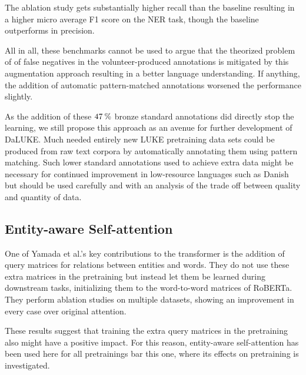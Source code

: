\documentclass[main.tex]{subfiles}
\begin{document}

The ablation study gets substantially higher recall than the baseline resulting in a higher micro average F1 score on the NER task, though the baseline outperforms in precision.

All in all, these benchmarks cannot be used to argue that the theorized problem of of false negatives in the volunteer-produced annotations is mitigated by this augmentation approach resulting in a better language understanding.
If anything, the addition of automatic pattern-matched annotations worsened the performance slightly.

As the addition of these $47\:\text{\%{}}$ bronze standard annotations did directly stop the learning, we still propose this approach as an avenue for further development of DaLUKE.
Much needed entirely new LUKE pretraining data sets could be produced from raw text corpora by automatically annotating them using pattern matching.
Such lower standard annotations used to achieve extra data might be necessary for continued improvement in low-resource languages such as Danish but should be used carefully and with an analysis of the trade off between quality and quantity of data.

\subsection{Entity-aware Self-attention}
One of Yamada et al.'s key contributions to the transformer is the addition of query matrices for relations between entities and words.
They do not use these extra matrices in the pretraining but instead let them be learned during downstream tasks, initializing them to the word-to-word matrices of RoBERTa.
They perform ablation studies on multiple datasets, showing an improvement in every case over original attention.
\cite{yamada2020luke}

These results suggest that training the extra query matrices in the pretraining also might have a positive impact.
For this reason, entity-aware self-attention has been used here for all pretrainings bar this one, where its effects on pretraining is investigated.
\end{document}
